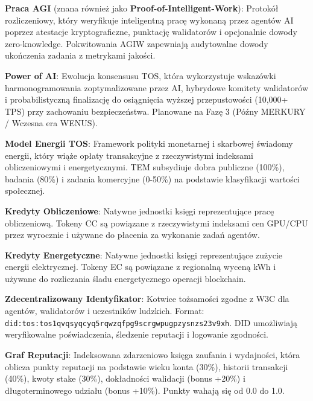 \documentclass[11pt]{article}
\begin{document}
\begin{description}[leftmargin=3cm, style=nextline]
  \item[AGIW (PoIW)] \textbf{Praca AGI} (znana również jako \textbf{Proof-of-Intelligent-Work}): Protokół rozliczeniowy, który weryfikuje inteligentną pracę wykonaną przez agentów AI poprzez atestacje kryptograficzne, punktację walidatorów i opcjonalnie dowody zero-knowledge. Pokwitowania AGIW zapewniają audytowalne dowody ukończenia zadania z metrykami jakości.

  \item[PAI] \textbf{Power of AI}: Ewolucja konsensusu TOS, która wykorzystuje wskazówki harmonogramowania zoptymalizowane przez AI, hybrydowe komitety walidatorów i probabilistyczną finalizację do osiągnięcia wyższej przepustowości (10,000+ TPS) przy zachowaniu bezpieczeństwa. Planowane na Fazę 3 (Późny MERKURY / Wczesna era WENUS).

  \item[TEM] \textbf{Model Energii TOS}: Framework polityki monetarnej i skarbowej świadomy energii, który wiąże opłaty transakcyjne z rzeczywistymi indeksami obliczeniowymi i energetycznymi. TEM subsydiuje dobra publiczne (100\%), badania (80\%) i zadania komercyjne (0-50\%) na podstawie klasyfikacji wartości społecznej.

  \item[CC] \textbf{Kredyty Obliczeniowe}: Natywne jednostki księgi reprezentujące pracę obliczeniową. Tokeny CC są powiązane z rzeczywistymi indeksami cen GPU/CPU przez wyrocznie i używane do płacenia za wykonanie zadań agentów.

  \item[EC] \textbf{Kredyty Energetyczne}: Natywne jednostki księgi reprezentujące zużycie energii elektrycznej. Tokeny EC są powiązane z regionalną wyceną kWh i używane do rozliczania śladu energetycznego operacji blockchain.

  \item[DID] \textbf{Zdecentralizowany Identyfikator}: Kotwice tożsamości zgodne z W3C dla agentów, walidatorów i uczestników ludzkich. Format: \texttt{did:tos:tos1qvqsyqcyq5rqwzqfpg9scrgwpugpzysnzs23v9xh}. DID umożliwiają weryfikowalne poświadczenia, śledzenie reputacji i logowanie zgodności.

  \item[RepGraph] \textbf{Graf Reputacji}: Indeksowana zdarzeniowo księga zaufania i wydajności, która oblicza punkty reputacji na podstawie wieku konta (30\%), historii transakcji (40\%), kwoty stake (30\%), dokładności walidacji (bonus +20\%) i długoterminowego udziału (bonus +10\%). Punkty wahają się od 0.0 do 1.0.


\end{description}
\end{document}
